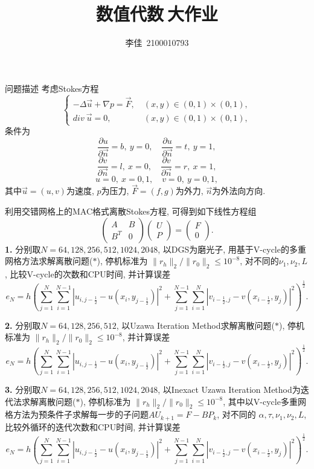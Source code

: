 \documentclass{article}
\title{数值代数$\ $大作业}
\author{李佳~2100010793}
\date{}
\begin{document}
\maketitle
\begin{section}{问题描述}
\noindent 考虑Stokes方程
$$ \left\{
\begin{aligned}
        -\Delta \vec{u} + \nabla p = \vec{F},\  &(x,y)\in (0,1)\times(0,1),\\
        div\ \vec{u} = 0,\  &(x,y)\in (0,1)\times(0,1),
\end{aligned}\right.$$
条件为
$$\frac{\partial u}{\partial\vec{n}}=b,\ y=0,\quad \frac{\partial u}{\partial\vec{n}}=t,\ y=1,$$
$$\frac{\partial v}{\partial\vec{n}}=l,\ x=0,\quad \frac{\partial v}{\partial\vec{n}}=r,\ x=1,$$
$$u=0,\ x=0,1,\quad v=0,\ y=0,1,$$
其中$\vec{u}=(u,v)$为速度, $p$为压力, $\vec{F}=(f,g)$为外力, $\vec{n}$为外法向方向.

利用交错网格上的MAC格式离散Stokes方程, 可得到如下线性方程组
\begin{equation}\begin{pmatrix}
    A & B\\
    B^T& 0
\end{pmatrix}\begin{pmatrix}
    U\\P
\end{pmatrix}=\begin{pmatrix}
    F\\0
\end{pmatrix}.\tag{$\ast$ }\end{equation}
\noindent\textbf{1.} 分别取$N=64,128,256,512,1024,2048$, 以DGS为磨光子, 用基于V-cycle的多重网格方法求解离散问题($\ast $), 停机标准为
$\lVert r_h\rVert_2/\lVert r_0\rVert_2\leq 10^{-8} $, 对不同的$\nu_1,\nu_2,L$, 比较V-cycle的次数和CPU时间, 并计算误差
$$e_N = h(\sum_{j=1}^N\sum_{i=1}^{N-1}|u_{i,j-\frac{1}{2}}-u(x_i,y_{j-\frac{1}{2}})|^2+
\sum_{j=1}^{N-1}\sum_{i=1}^{N}|v_{i-\frac{1}{2},j}-v(x_{i-\frac{1}{2}},y_{j})|^2)^{\frac{1}{2}}.$$

\noindent\textbf{2.} 分别取$N=64,128,256,512$, 以Uzawa Iteration Method求解离散问题($\ast $), 停机标准为
$\lVert r_h\rVert_2/\lVert r_0\rVert_2\leq 10^{-8} $, 并计算误差
$$e_N = h(\sum_{j=1}^N\sum_{i=1}^{N-1}|u_{i,j-\frac{1}{2}}-u(x_i,y_{j-\frac{1}{2}})|^2+
\sum_{j=1}^{N-1}\sum_{i=1}^{N}|v_{i-\frac{1}{2},j}-v(x_{i-\frac{1}{2}},y_{j})|^2)^{\frac{1}{2}}.$$

\noindent\textbf{3.} 分别取$N=64,128,256,512,1024,2048$, 以Inexact Uzawa Iteration Method为迭代法求解离散问题($\ast $), 停机标准为
$\lVert r_h\rVert_2/\lVert r_0\rVert_2\leq 10^{-8} $, 其中以V-cycle多重网格方法为预条件子求解每一步的子问题$AU_{k+1}=F-BP_k$, 对不同的
$\alpha,\tau,\nu_1,\nu_2,L$, 比较外循环的迭代次数和CPU时间, 并计算误差
$$e_N = h(\sum_{j=1}^N\sum_{i=1}^{N-1}|u_{i,j-\frac{1}{2}}-u(x_i,y_{j-\frac{1}{2}})|^2+
\sum_{j=1}^{N-1}\sum_{i=1}^{N}|v_{i-\frac{1}{2},j}-v(x_{i-\frac{1}{2}},y_{j})|^2)^{\frac{1}{2}}.$$
\end{section}
\end{document}
